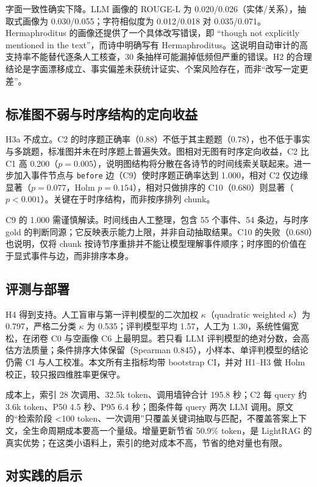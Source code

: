 字面一致性确实下降。LLM 画像的 ROUGE-L 为 0.020/0.026（实体/关系），抽取式画像为 0.030/0.055；字符相似度为 0.012/0.018 对 0.035/0.071。Hermaphroditus 的画像还提供了一个具体改写错误，即 “though not explicitly mentioned in the text”，而诗中明确写有 Hermaphroditus。这说明自动审计的高支持率不能替代逐条人工核查，30 条抽样可能漏掉低频但严重的错误。H2 的合理结论是字面漂移成立、事实偏差未获统计证实、个案风险存在，而非“改写一定更差”。

\subsection{标准图不弱与时序结构的定向收益}

H3a 不成立。C2 的时序题正确率（0.88）不低于其主题题（0.78），也不低于事实与多跳题，标准图并未在时序题上普遍失效。图相对无图有时序定向收益，C2 比 C1 高 0.200（$p=0.005$），说明图结构将分散在各诗节的时间线索关联起来。进一步加入事件节点与 \texttt{before} 边（C9）使时序题正确率达到 1.000，相对 C2 仅边缘显著（$p=0.077$，Holm $p=0.154$），相对只做排序的 C10（0.680）则显著（$p<0.001$）。关键在于时序结构，而非按序排列 chunk。

C9 的 1.000 需谨慎解读。时间线由人工整理，包含 55 个事件、54 条边，与时序 gold 的判断同源；它反映表示能力上限，并非自动抽取结果。C10 的失败（0.680）也说明，仅将 chunk 按诗节序重排并不能让模型理解事件顺序；时序图的价值在于显式事件与边，而非排序本身。

\subsection{评测与部署}

H4 得到支持。人工盲审与第一评判模型的二次加权 $\kappa$（quadratic weighted $\kappa$）为 0.797，严格二分类 $\kappa$ 为 0.535；评判模型平均 1.57，人工为 1.30，系统性偏宽松，在闭卷 C0 与空画像 C6 上最明显。若只看 LLM 评判模型的绝对分数，会高估方法质量；条件排序大体保留（Spearman 0.845），小样本、单评判模型的结论仍需 CI 与人工校准。本文所有主指标均带 bootstrap CI，并对 H1--H3 做 Holm 校正，较只报四维胜率更保守。

成本上，索引 28 次调用、32.5k token、调用墙钟合计 195.8 秒；C2 每 query 约 3.6k token、P50 4.5 秒、P95 6.4 秒；图条件每 query 两次 LLM 调用。原文的“检索阶段 <100 token、一次调用”只覆盖关键词抽取与匹配，不覆盖答案上下文，全生命周期成本要高一个量级。增量更新节省 50.9\% token，是 LightRAG 的真实优势；在这类小语料上，索引的绝对成本不高，节省的绝对量也有限。

\subsection{对实践的启示}

